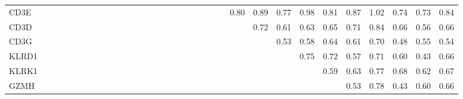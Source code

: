 \begin{longtable}{lrrrrrrrrrrrrrrrrrrrrrrrrrrrrrrrr}
CD3E     &              &           &            &           &              &              &            &              &           &             &             &            &            &             &            &            &            &           &            &           &                &            &       0.80 &       0.89 &        0.77 &        0.98 &       0.81 &        0.87 &        1.02 &       0.74 &          0.73 &        0.84 \\
CD3D     &              &           &            &           &              &              &            &              &           &             &             &            &            &             &            &            &            &           &            &           &                &            &            &       0.72 &        0.61 &        0.63 &       0.65 &        0.71 &        0.84 &       0.66 &          0.56 &        0.66 \\
CD3G     &              &           &            &           &              &              &            &              &           &             &             &            &            &             &            &            &            &           &            &           &                &            &            &            &        0.53 &        0.58 &       0.64 &        0.61 &        0.70 &       0.48 &          0.55 &        0.54 \\
KLRD1    &              &           &            &           &              &              &            &              &           &             &             &            &            &             &            &            &            &           &            &           &                &            &            &            &             &        0.75 &       0.72 &        0.57 &        0.71 &       0.60 &          0.43 &        0.66 \\
KLRK1    &              &           &            &           &              &              &            &              &           &             &             &            &            &             &            &            &            &           &            &           &                &            &            &            &             &             &       0.59 &        0.63 &        0.77 &       0.68 &          0.62 &        0.67 \\
GZMH     &              &           &            &           &              &              &            &              &           &             &             &            &            &             &            &            &            &           &            &           &                &            &            &            &             &             &            &        0.53 &        0.78 &       0.43 &          0.60 &        0.66 \\

\end{longtable}
